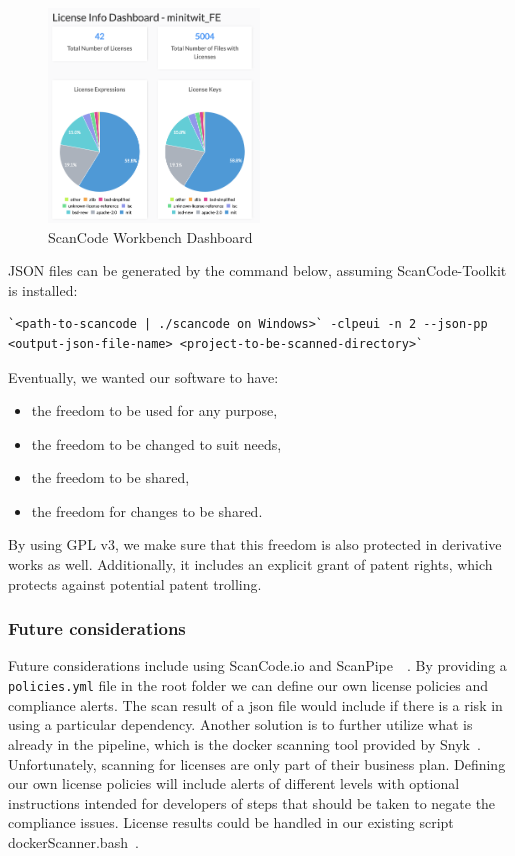 \begin{figure}[h]
    \centering
    \includegraphics[width=0.5\textwidth]{images/license/scancode_workbench_fe_results.png}
    \caption{ScanCode Workbench Dashboard}
    \label{fig:license}
\end{figure}

JSON files can be generated by the command below, assuming ScanCode-Toolkit is installed:

\begin{verbatim}
`<path-to-scancode | ./scancode on Windows>` -clpeui -n 2 --json-pp 
<output-json-file-name> <project-to-be-scanned-directory>`
\end{verbatim}

\vspace{3mm}

Eventually, we wanted our software to have:

\begin{itemize}[noitemsep]
    \item the freedom to be used for any purpose,
    \item the freedom to be changed to suit needs,
    \item the freedom to be shared,
    \item the freedom for changes to be shared.
\end{itemize}

By using GPL v3, we make sure that this freedom is also protected in derivative works as well. Additionally, it includes an explicit grant of patent rights, which protects against potential patent trolling.

\subsubsection*{Future considerations}
Future considerations include using ScanCode.io and ScanPipe~\cite{scanCodeIO}~\cite{ScanPipe}. By providing a \texttt{policies.yml} file in the root folder we can define our own license policies and compliance alerts. The scan result of a json file would include if there is a risk in using a particular dependency. Another solution is to further utilize what is already in the pipeline, which is the docker scanning tool provided by Snyk~\cite{snyk}. Unfortunately, scanning for licenses are only part of their business plan. Defining our own license policies will include alerts of different levels with optional instructions intended for developers of steps that should be taken to negate the compliance issues. License results could be handled in our existing script dockerScanner.bash~\cite{dockerScanner}.
